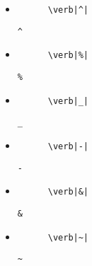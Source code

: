 \documentclass[a4paper,12pt]{article}
\begin{document}
\begin{itemize}
  \item
  \begin{minipage}[t]{.60\linewidth}
    \begin{verbatim}
      \verb|^|
    \end{verbatim}
  \end{minipage} \hfill
  \begin{minipage}[t]{.46\linewidth}
     \verb|^|
  \end{minipage}
  \item
  \begin{minipage}[t]{.60\linewidth}
    \begin{verbatim}
      \verb|%|
    \end{verbatim}
  \end{minipage} \hfill
  \begin{minipage}[t]{.46\linewidth}
     \verb|%|
  \end{minipage}
  \item
  \begin{minipage}[t]{.60\linewidth}
    \begin{verbatim}
      \verb|_|
    \end{verbatim}
  \end{minipage} \hfill
  \begin{minipage}[t]{.46\linewidth}
     \verb|_|
  \end{minipage}
  \item
  \begin{minipage}[t]{.60\linewidth}
    \begin{verbatim}
      \verb|-|
    \end{verbatim}
  \end{minipage} \hfill
  \begin{minipage}[t]{.46\linewidth}
     \verb|-|
  \end{minipage}
  \item
  \begin{minipage}[t]{.60\linewidth}
    \begin{verbatim}
      \verb|&|
    \end{verbatim}
  \end{minipage} \hfill
  \begin{minipage}[t]{.46\linewidth}
     \verb|&|
  \end{minipage}
  \item
  \begin{minipage}[t]{.60\linewidth}
    \begin{verbatim}
      \verb|~|
    \end{verbatim}
  \end{minipage} \hfill
  \begin{minipage}[t]{.46\linewidth}
     \verb|~|
  \end{minipage}
\end{itemize}



\end{document}
